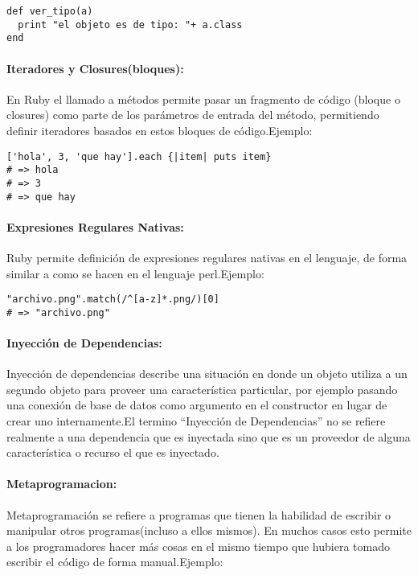 \begin{verbatim}
def ver_tipo(a)
  print "el objeto es de tipo: "+ a.class
end
\end{verbatim}

\paragraph{Iteradores y Closures(bloques):}
En Ruby el llamado a métodos permite pasar un fragmento de código (bloque o closures) como parte de los parámetros de entrada del método, permitiendo definir iteradores basados en estos bloques de código.\newline Ejemplo:

\begin{verbatim}
['hola', 3, 'que hay'].each {|item| puts item}
# => hola
# => 3
# => que hay
\end{verbatim}

\paragraph{Expresiones Regulares Nativas:}
Ruby permite definición de expresiones regulares nativas en el lenguaje, de forma similar a como se hacen en el lenguaje perl.\newline Ejemplo:

\begin{verbatim}
"archivo.png".match(/^[a-z]*.png/)[0]
# => "archivo.png"
\end{verbatim}

\paragraph{Inyección de Dependencias:}
Inyección de dependencias describe una situación en donde un objeto utiliza a un segundo objeto para proveer una característica particular, por ejemplo pasando una conexión de base de datos como argumento en el constructor en lugar de crear uno internamente.\newline El termino ``Inyección de Dependencias'' no se refiere realmente a una dependencia que es inyectada sino que es un proveedor de alguna característica o recurso el que es inyectado.

\paragraph{Metaprogramacion:}
Metaprogramación se refiere a programas que tienen la habilidad de escribir o manipular otros programas(incluso a ellos mismos). En muchos casos esto permite a los programadores hacer más cosas en el mismo tiempo que hubiera tomado escribir el código de forma manual.\newline Ejemplo:

